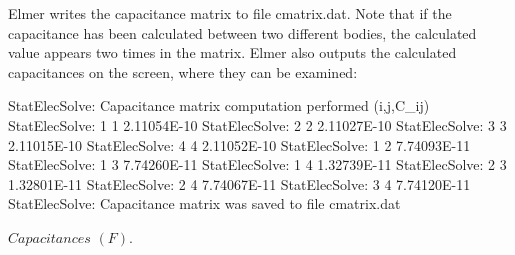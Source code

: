 \begin{flushleft}

Elmer writes the capacitance matrix to file cmatrix.dat.
Note that if the capacitance has been calculated between two different bodies, the calculated value appears two times in the matrix.
Elmer also outputs the calculated capacitances on the screen, where they can be examined:

\begin{center}
\ttbegin
StatElecSolve: Capacitance matrix computation performed (i,j,C_ij)
StatElecSolve:   1  1    2.11054E-10
StatElecSolve:   2  2    2.11027E-10
StatElecSolve:   3  3    2.11015E-10
StatElecSolve:   4  4    2.11052E-10
StatElecSolve:   1  2    7.74093E-11
StatElecSolve:   1  3    7.74260E-11
StatElecSolve:   1  4    1.32739E-11
StatElecSolve:   2  3    1.32801E-11
StatElecSolve:   2  4    7.74067E-11
StatElecSolve:   3  4    7.74120E-11
StatElecSolve: Capacitance matrix was saved to file cmatrix.dat
\ttend 

$Capacitances$ $(F)$.
\end{center}


\end{flushleft}




























